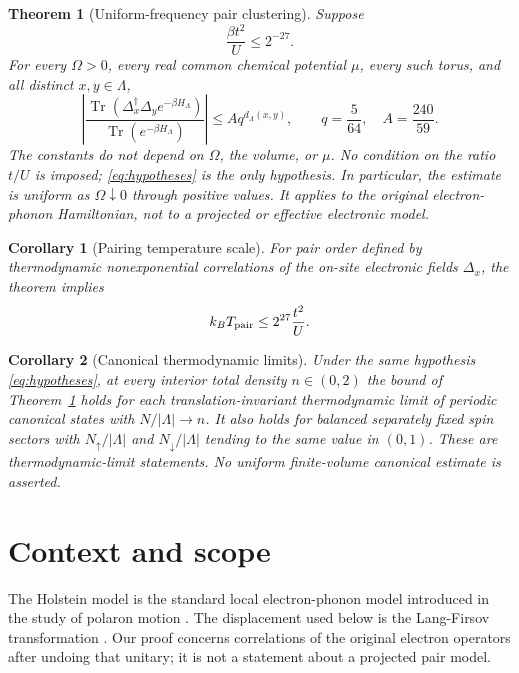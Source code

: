 \documentclass[11pt]{article}
\newtheorem{theorem}{Theorem}
\newtheorem{corollary}{Corollary}
\DeclareMathOperator{\Tr}{Tr}
\newcommand{\Deltaop}{\Delta}
\begin{document}
\begin{theorem}[Uniform-frequency pair clustering]\label{thm:main}
Suppose
\begin{equation}\label{eq:hypotheses}
 \frac{\beta t^2}{U}\le 2^{-27}.
\end{equation}
For every $\Omega>0$, every real common chemical potential $\mu$, every such torus, and all distinct $x,y\in\Lambda$,
\begin{equation}\label{eq:mainbound}
 \left|\frac{\Tr(\Deltaop_x^\dagger\Deltaop_y e^{-\beta H_\Lambda})}
 {\Tr(e^{-\beta H_\Lambda})}\right|
 \le A q^{d_\Lambda(x,y)},\qquad
 q=\frac{5}{64},\quad A=\frac{240}{59}.
\end{equation}
The constants do not depend on $\Omega$, the volume, or $\mu$. No condition on the ratio $t/U$ is imposed; \eqref{eq:hypotheses} is the only hypothesis. In particular, the estimate is uniform as $\Omega\downarrow0$ through positive values. It applies to the original electron-phonon Hamiltonian, not to a projected or effective electronic model.
\end{theorem}

\begin{corollary}[Pairing temperature scale]\label{cor:temperature}
For pair order defined by thermodynamic nonexponential correlations of the on-site electronic fields $\Deltaop_x$, the theorem implies
\[
 k_B T_{\rm pair}\le 2^{27}\frac{t^2}{U}.
\]
\end{corollary}

\begin{corollary}[Canonical thermodynamic limits]\label{cor:canonical}
Under the same hypothesis \eqref{eq:hypotheses}, at every interior total density $n\in(0,2)$ the bound of Theorem~\ref{thm:main} holds for each translation-invariant thermodynamic limit of periodic canonical states with $N/|\Lambda|\to n$. It also holds for balanced separately fixed spin sectors with $N_\uparrow/|\Lambda|$ and $N_\downarrow/|\Lambda|$ tending to the same value in $(0,1)$. These are thermodynamic-limit statements. No uniform finite-volume canonical estimate is asserted.
\end{corollary}

\section{Context and scope}
The Holstein model is the standard local electron-phonon model introduced in the study of polaron motion \cite{holstein}. The displacement used below is the Lang-Firsov transformation \cite{langfirsov}. Our proof concerns correlations of the original electron operators after undoing that unitary; it is not a statement about a projected pair model.
\end{document}
